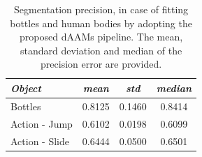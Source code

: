 \begin{table}[!h]
\small
\centering
\begin{tabular}{|l|c|c|c|}
\hline
\emph{Object}   & \emph{mean} & \emph{std} & \emph{median}\\
\hline\hline
Bottles         & 0.8125      & 0.1460     & 0.8414\\
Action - Jump   & 0.6102      & 0.0198     & 0.6099\\
Action - Slide  & 0.6444      & 0.0500     & 0.6501\\
\hline
\end{tabular}
\caption{Segmentation precision, in case of fitting bottles and human bodies by adopting the proposed dAAMs pipeline. The mean, standard deviation and median of the precision error are provided.}
\label{tab:seg_result}
\end{table}

% 
% 


